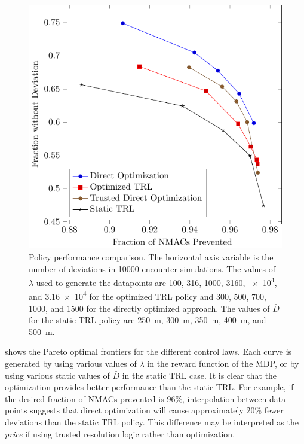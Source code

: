 \begin{figure}[tb]
    \centering
    \includegraphics[width=\columnwidth]{media/pareto.pdf}
    \caption[Policy performance comparison]{Policy performance comparison. The horizontal axis variable is the number of deviations in \num{10000} encounter simulations. The values of $\lambda$ used to generate the datapoints are \num{100}, \num{316}, \num{1000}, \num{3160}, \num{e4}, and \num{3.16e4} for the optimized TRL policy and \num{300}, \num{500}, \num{700}, \num{1000}, and \num{1500} for the directly optimized approach. The values of $\bar{D}$ for the static TRL policy are \SI{250}{m}, \SI{300}{m}, \SI{350}{m}, \SI{400}{m}, and \SI{500}{m}.}
       \label{fig:pareto}
\end{figure}

 shows the Pareto optimal frontiers for the different control laws. Each curve is generated by using various values of $\lambda$ in the reward function of the MDP, or by using various static values of $\bar{D}$ in the static TRL case. It is clear that the optimization provides better performance than the static TRL. For example, if the desired fraction of NMACs prevented is $96\%$, interpolation between data points suggests that direct optimization will cause approximately $20\%$ fewer deviations than the static TRL policy. This difference may be interpreted as the \emph{price} if using trusted resolution logic rather than optimization.

